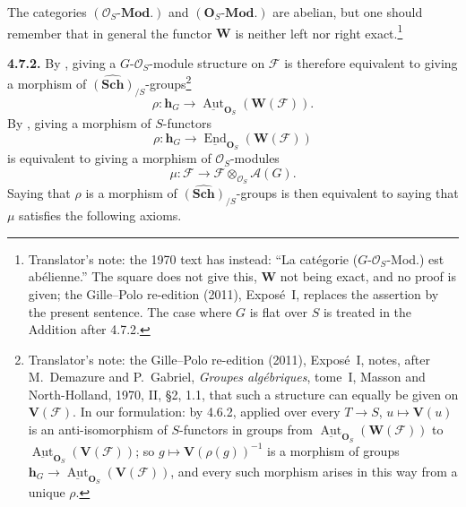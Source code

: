 \begin{center}
\end{center}
The categories \((\mathcal O_S\text{-}\mathbf{Mod.})\) and
\((\mathbf O_S\text{-}\mathbf{Mod.})\) are abelian, but one should
remember that in general the functor \(\mathbf W\) is neither left nor
right exact.\footnote{Translator's note: the 1970 text has instead: ``La
catégorie (\(G\)-\(\mathcal O_S\)-Mod.) est abélienne.'' The square does not
give this, \(\mathbf W\) not being exact, and no proof is given; the
Gille--Polo re-edition (2011), Exposé~I, replaces the assertion by the
present sentence. The case where \(G\) is flat over \(S\) is treated in the
Addition after 4.7.2.}

\medskip
\noindent{}\textbf{4.7.2.}
By , giving a \(G\)-\(\mathcal O_S\)-module structure on
\(\mathscr F\) is therefore equivalent to giving a morphism of
\(\widehat{(\mathbf{Sch})}_{/S}\)-groups\footnote{Translator's note: the Gille--Polo re-edition (2011), Exposé~I, notes, after
M.~Demazure and P.~Gabriel, \textit{Groupes algébriques}, tome~I, Masson
and North-Holland, 1970, II, \S2, 1.1, that such a structure can equally be
given on \(\mathbf V(\mathscr F)\). In our formulation: by 4.6.2, applied
over every \(T\to S\), \(u\mapsto\mathbf V(u)\) is an anti-isomorphism of
\(S\)-functors in groups from
\(\underline{\operatorname{Aut}}_{\mathbf O_S}(\mathbf W(\mathscr F))\) to
\(\underline{\operatorname{Aut}}_{\mathbf O_S}(\mathbf V(\mathscr F))\); so
\(g\mapsto\mathbf V(\rho(g))^{-1}\) is a morphism of groups
\(\mathbf h_G\to\underline{\operatorname{Aut}}_{\mathbf O_S}(\mathbf V(\mathscr F))\),
and every such morphism arises in this way from a unique \(\rho\).}
\[
  \rho:\mathbf h_G\longrightarrow
    \underline{\operatorname{Aut}}_{\mathbf O_S}
      (\mathbf W(\mathscr F)).
\]
By , giving a morphism of \(S\)-functors
\[
  \rho:\mathbf h_G\longrightarrow
    \underline{\operatorname{End}}_{\mathbf O_S}
      (\mathbf W(\mathscr F))
\]
is equivalent to giving a morphism of \(\mathcal O_S\)-modules
\[
  \mu:\mathscr F\longrightarrow
    \mathscr F\otimes_{\mathcal O_S}\mathscr A(G).
\]
Saying that \(\rho\) is a morphism of
\(\widehat{(\mathbf{Sch})}_{/S}\)-groups is then equivalent to saying
that \(\mu\) satisfies the following axioms.

